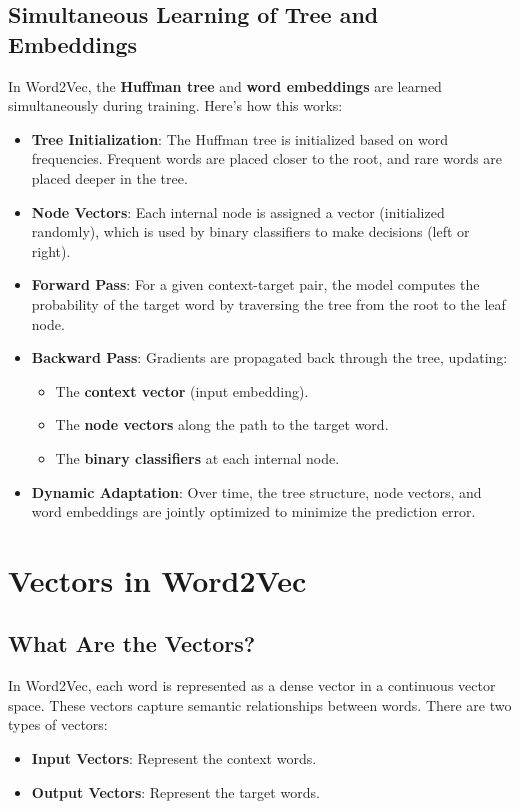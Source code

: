 \begin{notechapter}
\subsection{Simultaneous Learning of Tree and Embeddings}
In Word2Vec, the \textbf{Huffman tree} and \textbf{word embeddings} are learned
simultaneously during training. Here's how this works:
\begin{itemize}
    \item \textbf{Tree Initialization}: The Huffman tree is initialized
          based on word frequencies. Frequent words are placed closer
          to the root, and rare words are placed deeper in the tree.
    \item \textbf{Node Vectors}: Each internal node is assigned a vector
          (initialized randomly), which is used by binary classifiers
          to make decisions (left or right).
    \item \textbf{Forward Pass}: For a given context-target pair, the
          model computes the probability of the target word by traversing
          the tree from the root to the leaf node.
    \item \textbf{Backward Pass}: Gradients are propagated back through
          the tree, updating:
          \begin{itemize}
              \item The \textbf{context vector} (input embedding).
              \item The \textbf{node vectors} along the path to the target word.
              \item The \textbf{binary classifiers} at each internal node.
          \end{itemize}
    \item \textbf{Dynamic Adaptation}: Over time, the tree structure,
          node vectors, and word embeddings are jointly optimized to
          minimize the prediction error.
\end{itemize}

\section{Vectors in Word2Vec}
\subsection{What Are the Vectors?}
In Word2Vec, each word is represented as a dense vector in a
continuous vector space. These vectors capture semantic
relationships between words. There are two types of vectors:
\begin{itemize}
    \item \textbf{Input Vectors}: Represent the context words.
    \item \textbf{Output Vectors}: Represent the target words.
\end{itemize}


\end{notechapter}
